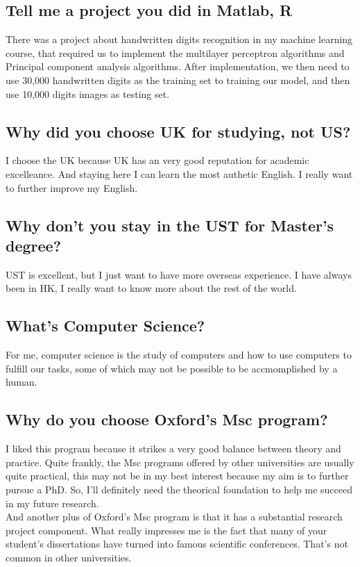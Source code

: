 \documentclass[12pt, landscape]{article}
\begin{document}
\begin{multicols}{2}
\subsection{Tell me a project you did in Matlab, R}
There was a project about handwritten digits recognition in my machine learning course, that required us to implement the multilayer perceptron algorithms and Principal component analysis algorithms. After implementation, we then need to use 30,000 handwritten digits as the training set to training our model, and then use 10,000 digits images as testing set.

\subsection{Why did you choose UK for studying, not US?}
I choose the UK because UK has an very good reputation for academic excelleance. And staying here I can learn the most authetic English. I really want to further improve my English. 


\subsection{Why don't you stay in the UST for Master's degree?}
UST is excellent, but I just want to have more overseas experience. I have always been in HK, I really want to know more about the rest of the world.


\subsection{What's Computer Science?}
For me, computer science is the study of computers and how to use computers to fulfill our tasks, some of which may not be possible to be accmomplished by a human.


\subsection{Why do you choose Oxford's Msc program?}
I liked this program because it strikes a very good balance between theory and practice. Quite frankly, the Msc programs offered by other universities are usually quite practical, this may not be in my best interest because my aim is to further pursue a PhD. So, I'll definitely need the theorical foundation to help me succeed in my future research. \\

And another plus of Oxford's Msc program is that it has a substantial research project component. What really impresses me is the fact that many of your student's dissertations have turned into famous scientific conferences. That's not common in other universities.



\end{multicols}
\end{document}
